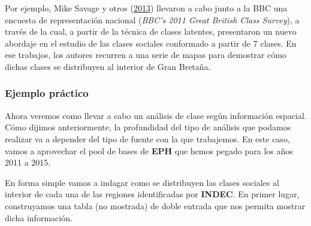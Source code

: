 \documentclass[
]{article}
\begin{document}
Por ejemplo, Mike Savage y otros (\protect\hyperlink{ref-Savage.etal2013}{2013}) llevaron a cabo junto a la BBC una encuesta de representación nacional (\emph{BBC's 2011 Great British Class Survey}), a través de la cual, a partir de la técnica de clases latentes, presentaron un nuevo abordaje en el estudio de las clases sociales conformado a partir de 7 clases. En ese trabajos, los autores recurren a una serie de mapas para demostrar cómo dichas clases se distribuyen al interior de Gran Bretaña.

\hypertarget{ejemplo-pruxe1ctico-1}{%
\subsubsection{Ejemplo práctico}\label{ejemplo-pruxe1ctico-1}}

Ahora veremos como llevar a cabo un análisis de clase según información espacial. Cómo dijimos anteriormente, la profundidad del tipo de análisis que podamos realizar va a depender del tipo de fuente con la que trabajemos. En este caso, vamos a aprovechar el pool de bases de \textbf{EPH} que hemos pegado para los años 2011 a 2015.

En forma simple vamos a indagar como se distribuyen las clases sociales al interior de cada una de las regiones identificadas por \textbf{INDEC}. En primer lugar, construyamos una tabla (no mostrada) de doble entrada que nos permita mostrar dicha información.
\end{document}
